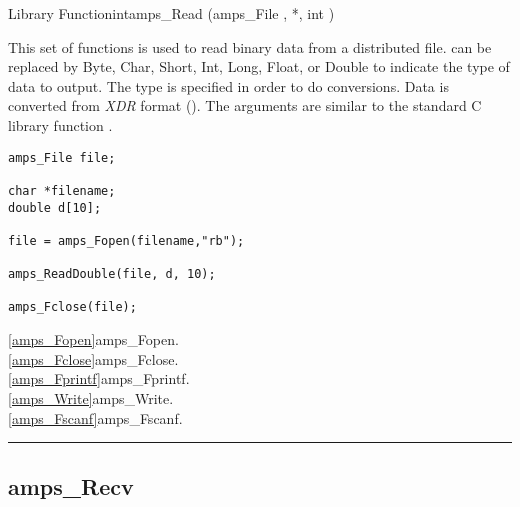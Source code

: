 \begin{deftypefn}{Library Function}{int}{amps\_Read}
(amps_File ,  *, int )

\DESCRIPTION

This set of functions is used to read binary data from a distributed file.
  can be replaced by Byte, Char, Short, Int, Long, Float, or Double
to indicate the type of data to output.  The type is specified in order
to do conversions.  Data is converted from {\em XDR} format (\cite{xdr.87}).
The arguments are similar to the standard C library function
.

\EXAMPLE
\begin{display}\begin{verbatim}
amps_File file;

char *filename;
double d[10];

file = amps_Fopen(filename,"rb");

amps_ReadDouble(file, d, 10);

amps_Fclose(file);
\end{verbatim}\end{display}

\SEEALSO
\vref{amps_Fopen}{amps\_Fopen}. \\
\vref{amps_Fclose}{amps\_Fclose}. \\
\vref{amps_Fprintf}{amps\_Fprintf}. \\
\vref{amps_Write}{amps\_Write}. \\
\vref{amps_Fscanf}{amps\_Fscanf}. \\

\end{deftypefn}



\noindent\rule{\textwidth}{1mm}

\subsection{amps\_Recv}
\label{amps_Recv}



